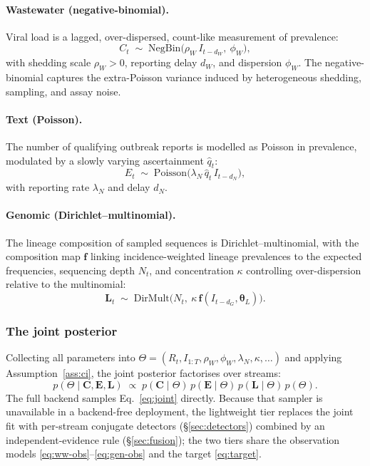 \documentclass[10pt,twocolumn]{article}
\theoremstyle{definition}
\newcommand{\Rt}{R_t}
\newcommand{\Pois}{\mathrm{Poisson}}
\newcommand{\NB}{\mathrm{NegBin}}
\begin{document}
\paragraph{Wastewater (negative-binomial).}
Viral load is a lagged, over-dispersed, count-like measurement of prevalence:
\begin{equation}
C_t \;\sim\; \NB\!\big(\rho_W\, I_{t-d_W},\ \phi_W\big),
\label{eq:ww-obs}
\end{equation}
with shedding scale $\rho_W>0$, reporting delay $d_W$, and dispersion $\phi_W$.
The negative-binomial captures the extra-Poisson variance induced by
heterogeneous shedding, sampling, and assay noise.

\paragraph{Text (Poisson).}
The number of qualifying outbreak reports is modelled as Poisson in prevalence,
modulated by a slowly varying ascertainment $\hat q_t$:
\begin{equation}
E_t \;\sim\; \Pois\!\big(\lambda_N\, \hat q_t\, I_{t-d_N}\big),
\label{eq:text-obs}
\end{equation}
with reporting rate $\lambda_N$ and delay $d_N$.

\paragraph{Genomic (Dirichlet--multinomial).}
The lineage composition of sampled sequences is Dirichlet--multinomial, with the
composition map $\mathbf f$ linking incidence-weighted lineage prevalences to the
expected frequencies, sequencing depth $N_t$, and concentration $\kappa$
controlling over-dispersion relative to the multinomial:
\begin{equation}
\mathbf L_t \;\sim\; \mathrm{DirMult}\!\big(N_t,\ \kappa\, \mathbf f(I_{t-d_G},\boldsymbol\theta_L)\big).
\label{eq:gen-obs}
\end{equation}

\subsubsection{The joint posterior}
Collecting all parameters into $\Theta=(\Rt, I_{1:T}, \rho_W,\phi_W,\lambda_N,\kappa,\dots)$
and applying Assumption~\ref{ass:ci}, the joint posterior factorises over streams:
\begin{equation}
p(\Theta \mid \mathbf C,\mathbf E,\mathbf L)
\;\propto\;
p(\mathbf C\mid\Theta)\,p(\mathbf E\mid\Theta)\,p(\mathbf L\mid\Theta)\,p(\Theta).
\label{eq:joint}
\end{equation}
The full backend samples Eq.~\eqref{eq:joint} directly. Because that sampler is
unavailable in a backend-free deployment, the lightweight tier replaces the joint
fit with per-stream conjugate detectors (\S\ref{sec:detectors}) combined by an
independent-evidence rule (\S\ref{sec:fusion}); the two tiers share the
observation models \eqref{eq:ww-obs}--\eqref{eq:gen-obs} and the target
\eqref{eq:target}.
\end{document}
